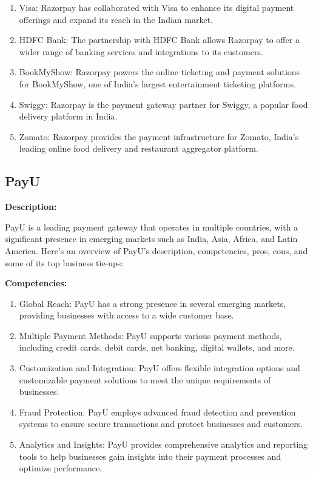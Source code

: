 \begin{enumerate}
  \item Visa: Razorpay has collaborated with Visa to enhance its digital payment offerings and expand its reach in the Indian market.
  \item HDFC Bank: The partnership with HDFC Bank allows Razorpay to offer a wider range of banking services and integrations to its customers.
  \item BookMyShow: Razorpay powers the online ticketing and payment solutions for BookMyShow, one of India's largest entertainment ticketing platforms.
  \item Swiggy: Razorpay is the payment gateway partner for Swiggy, a popular food delivery platform in India.
  \item Zomato: Razorpay provides the payment infrastructure for Zomato, India's leading online food delivery and restaurant aggregator platform.
\end{enumerate}

\subsection{PayU}
\textbf{Description:}

PayU is a leading payment gateway that operates in multiple countries, with a significant presence in emerging markets such as India, Asia, Africa, and Latin America. Here's an overview of PayU's description, competencies, pros, cons, and some of its top business tie-ups:

\textbf{Competencies:}

\begin{enumerate}
  \item Global Reach: PayU has a strong presence in several emerging markets, providing businesses with access to a wide customer base.
  \item Multiple Payment Methods: PayU supports various payment methods, including credit cards, debit cards, net banking, digital wallets, and more.
  \item Customization and Integration: PayU offers flexible integration options and customizable payment solutions to meet the unique requirements of businesses.
  \item Fraud Protection: PayU employs advanced fraud detection and prevention systems to ensure secure transactions and protect businesses and customers.
  \item Analytics and Insights: PayU provides comprehensive analytics and reporting tools to help businesses gain insights into their payment processes and optimize performance.
\end{enumerate}

